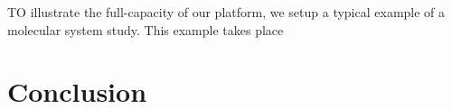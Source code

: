 \documentclass{vgtc}                          %
\begin{document}
TO illustrate the full-capacity of our platform, we setup a typical example of a molecular system study. This example takes place 

\section{Conclusion}





\end{document}
